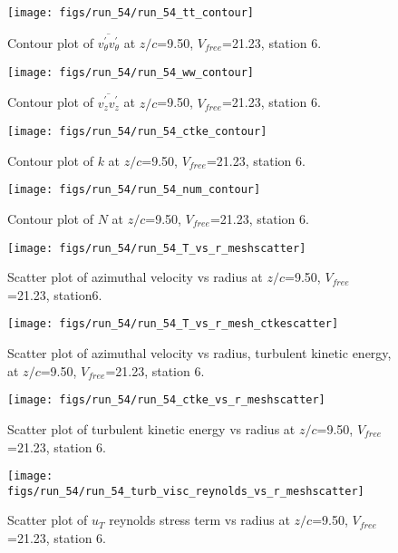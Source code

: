 \begin{figure}[H]
\centering
\texttt{[image: figs/run\_54/run\_54\_tt\_contour]}
\caption{Contour plot of $\overline{v_{\theta}^{\prime} v_{\theta}^{\prime}}$ at $z/c$=9.50, $V_{free}$=21.23, station 6.}
\end{figure}


\begin{figure}[H]
\centering
\texttt{[image: figs/run\_54/run\_54\_ww\_contour]}
\caption{Contour plot of $\overline{v_{z}^{\prime} v_{z}^{\prime}}$ at $z/c$=9.50, $V_{free}$=21.23, station 6.}
\end{figure}


\begin{figure}[H]
\centering
\texttt{[image: figs/run\_54/run\_54\_ctke\_contour]}
\caption{Contour plot of $k$ at $z/c$=9.50, $V_{free}$=21.23, station 6.}
\end{figure}


\begin{figure}[H]
\centering
\texttt{[image: figs/run\_54/run\_54\_num\_contour]}
\caption{Contour plot of $N$ at $z/c$=9.50, $V_{free}$=21.23, station 6.}
\end{figure}


\begin{figure}[H]
\centering
\texttt{[image: figs/run\_54/run\_54\_T\_vs\_r\_meshscatter]}
\caption{Scatter plot of azimuthal velocity vs radius at $z/c$=9.50, $V_{free}$=21.23, station6.}
\end{figure}


\begin{figure}[H]
\centering
\texttt{[image: figs/run\_54/run\_54\_T\_vs\_r\_mesh\_ctkescatter]}
\caption{Scatter plot of azimuthal velocity vs radius, turbulent kinetic energy, at $z/c$=9.50, $V_{free}$=21.23, station 6.}
\end{figure}


\begin{figure}[H]
\centering
\texttt{[image: figs/run\_54/run\_54\_ctke\_vs\_r\_meshscatter]}
\caption{Scatter plot of turbulent kinetic energy vs radius at $z/c$=9.50, $V_{free}$=21.23, station 6.}
\end{figure}


\begin{figure}[H]
\centering
\texttt{[image: figs/run\_54/run\_54\_turb\_visc\_reynolds\_vs\_r\_meshscatter]}
\caption{Scatter plot of $
u_T$ reynolds stress term vs radius at $z/c$=9.50, $V_{free}$=21.23, station 6.}
\end{figure}


